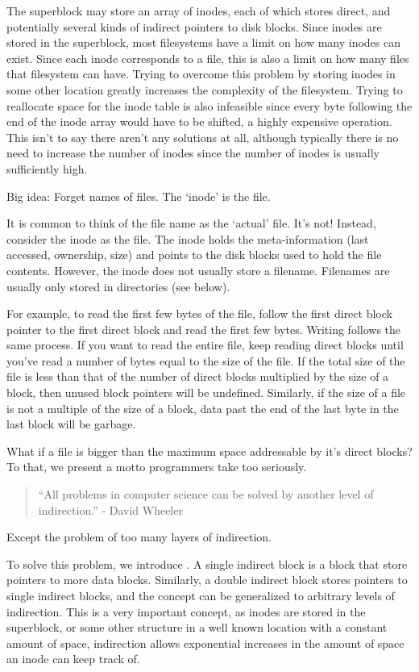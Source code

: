 The superblock may store an array of inodes, each of which stores direct, and potentially several kinds of indirect pointers to disk blocks.
Since inodes are stored in the superblock, most filesystems have a limit on how many inodes can exist.
Since each inode corresponds to a file, this is also a limit on how many files that filesystem can have.
Trying to overcome this problem by storing inodes in some other location greatly increases the complexity of the filesystem.
Trying to reallocate space for the inode table is also infeasible since every byte following the end of the inode array would have to be shifted, a highly expensive operation.
This isn't to say there aren't any solutions at all, although typically there is no need to increase the number of inodes since the number of inodes is usually sufficiently high.

Big idea: Forget names of files.
The `inode' is the file.

It is common to think of the file name as the `actual' file.
It's not!
Instead, consider the inode as the file.
The inode holds the meta-information (last accessed, ownership, size) and points to the disk blocks used to hold the file contents.
However, the inode does not usually store a filename.
Filenames are usually only stored in directories (see below).

For example, to read the first few bytes of the file, follow the first direct block pointer to the first direct block and read the first few bytes.
Writing follows the same process.
If you want to read the entire file, keep reading direct blocks until you've read a number of bytes equal to the size of the file.
If the total size of the file is less than that of the number of direct blocks multiplied by the size of a block, then unused block pointers will be undefined.
Similarly, if the size of a file is not a multiple of the size of a block, data past the end of the last byte in the last block will be garbage.

What if a file is bigger than the maximum space addressable by it's direct blocks?
To that, we present a motto programmers take too seriously.

\begin{quote}
``All problems in computer science can be solved by another level of indirection.'' - David Wheeler
\end{quote}

Except the problem of too many layers of indirection.

To solve this problem, we introduce .
A single indirect block is a block that store pointers to more data blocks.
Similarly, a double indirect block stores pointers to single indirect blocks, and the concept can be generalized to arbitrary levels of indirection.
This is a very important concept, as inodes are stored in the superblock, or some other structure in a well known location with a constant amount of space, indirection allows exponential increases in the amount of space an inode can keep track of.

